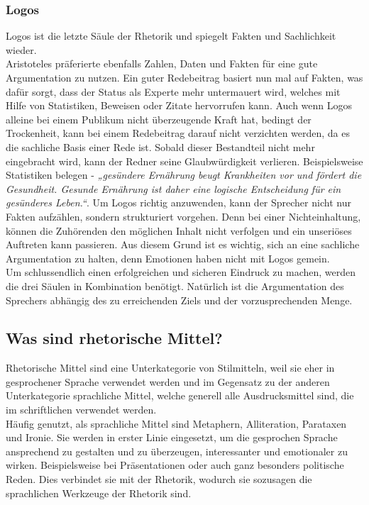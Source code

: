 \subsubsection{Logos}
\label{sec: Logos}
Logos ist die letzte Säule der Rhetorik und spiegelt Fakten und Sachlichkeit wieder. 
\\Aristoteles präferierte ebenfalls Zahlen, Daten und Fakten für eine gute Argumentation zu nutzen.  Ein guter Redebeitrag basiert nun mal auf Fakten, was dafür sorgt, dass der Status als Experte mehr untermauert wird, welches mit Hilfe von Statistiken, Beweisen oder Zitate hervorrufen kann. Auch wenn Logos alleine bei einem Publikum nicht überzeugende Kraft hat, bedingt der Trockenheit, kann bei einem Redebeitrag darauf nicht verzichten werden, da es die sachliche Basis einer Rede ist. Sobald dieser Bestandteil nicht mehr eingebracht wird, kann der Redner seine Glaubwürdigkeit verlieren. Beispielsweise Statistiken belegen - \textit{„gesündere Ernährung beugt Krankheiten vor und fördert die Gesundheit. Gesunde Ernährung ist daher eine logische Entscheidung für ein gesünderes Leben.“}. Um Logos richtig anzuwenden, kann der Sprecher nicht nur Fakten aufzählen, sondern strukturiert vorgehen. Denn bei einer Nichteinhaltung, können die Zuhörenden den möglichen Inhalt nicht verfolgen und ein unseriöses Auftreten kann passieren. Aus diesem Grund ist es wichtig, sich an eine sachliche Argumentation zu halten, denn Emotionen haben nicht mit Logos gemein.
\\Um schlussendlich einen erfolgreichen und sicheren Eindruck zu machen, werden die drei Säulen in Kombination benötigt. Natürlich ist die Argumentation des Sprechers abhängig des zu erreichenden Ziels und der vorzusprechenden Menge.

\subsection{Was sind rhetorische Mittel?}
\label{sec: Was sind rhetorische Mittel?}
Rhetorische Mittel sind eine Unterkategorie von Stilmitteln, weil sie eher in gesprochener Sprache verwendet werden und im Gegensatz zu der anderen Unterkategorie sprachliche Mittel, welche generell alle Ausdrucksmittel sind, die im schriftlichen verwendet werden. 
\\Häufig genutzt, als sprachliche Mittel sind Metaphern, Alliteration, Parataxen und Ironie. Sie werden in erster Linie eingesetzt, um die gesprochen Sprache ansprechend zu gestalten und zu überzeugen, interessanter und emotionaler zu wirken. Beispielsweise bei Präsentationen oder auch ganz besonders politische Reden. Dies verbindet sie mit der Rhetorik, wodurch sie sozusagen die sprachlichen Werkzeuge der Rhetorik sind.

